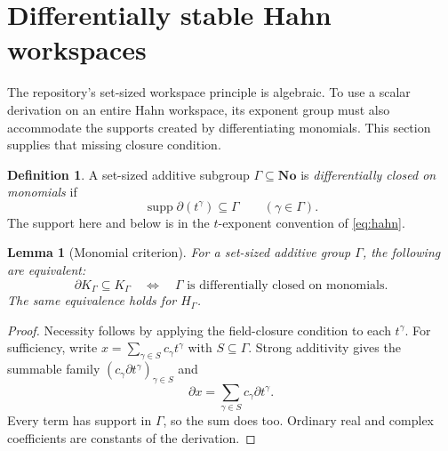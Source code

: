 \documentclass[11pt,a4paper]{article}
\newtheorem{lemma}[theorem]{Lemma}
\theoremstyle{definition}
\newtheorem{definition}[theorem]{Definition}
\newcommand{\No}{\mathbf{No}}
\newcommand{\D}{\partial}
\newcommand{\supp}{\operatorname{supp}}
\numberwithin{equation}{section}
\begin{document}
\section{Differentially stable Hahn workspaces}\label{sec:hull}

The repository's set-sized workspace principle is algebraic. To use a
scalar derivation on an entire Hahn workspace, its exponent group must
also accommodate the supports created by differentiating monomials.
This section supplies that missing closure condition.

\begin{definition}
A set-sized additive subgroup $\Gamma\subseteq\No$ is
\emph{differentially closed on monomials} if
\[
 \supp\D(t^\gamma)\subseteq\Gamma\qquad(\gamma\in\Gamma).
\]
The support here and below is in the $t$-exponent convention of
\eqref{eq:hahn}.
\end{definition}

\begin{lemma}[Monomial criterion]\label{lem:monomialcriterion}
For a set-sized additive group $\Gamma$, the following are equivalent:
\[
 \D K_\Gamma\subseteq K_\Gamma
 \quad\Longleftrightarrow\quad
 \Gamma\text{ is differentially closed on monomials}.
\]
The same equivalence holds for $H_\Gamma$.
\end{lemma}
\begin{proof}
Necessity follows by applying the field-closure condition to each
$t^\gamma$. For sufficiency, write
$x=\sum_{\gamma\in S}c_\gamma t^\gamma$ with $S\subseteq\Gamma$.
Strong additivity gives the summable family
$(c_\gamma\D t^\gamma)_{\gamma\in S}$ and
\[
 \D x=\sum_{\gamma\in S}c_\gamma\D t^\gamma.
\]
Every term has support in $\Gamma$, so the sum does too. Ordinary real
and complex coefficients are constants of the derivation.
\end{proof}
\end{document}

